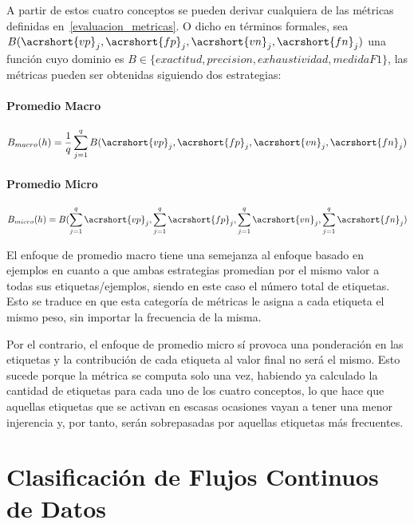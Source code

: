 A partir de estos cuatro conceptos se pueden derivar cualquiera de las métricas
definidas en~\ref{evaluacion_metricas}. O dicho en términos formales, sea
$B(\acrshort{vp}_{j}, \acrshort{fp}_{j}, \acrshort{vn}_{j}, \acrshort{fn}_{j})$
una función cuyo dominio es $B \in \{ exactitud, precision, exhaustividad,
	medidaF1 \}$, las métricas pueden ser obtenidas siguiendo dos estrategias:

\paragraph{Promedio Macro}

\begin{equation}
	B_{macro}(h) = \frac{1}{q} \sum_{j=1}^{q}
	B(\acrshort{vp}_{j}, \acrshort{fp}_{j}, \acrshort{vn}_{j}, \acrshort{fn}_{j})
\end{equation}

\paragraph{Promedio Micro}

\begin{equation}
	B_{micro}(h) = B( \sum_{j=1}^{q} \acrshort{vp}_{j}, \sum_{j=1}^{q}
	\acrshort{fp}_{j},\sum_{j=1}^{q}  \acrshort{vn}_{j},\sum_{j=1}^{q}
	\acrshort{fn}_{j})
\end{equation}

El enfoque de promedio macro tiene una semejanza al enfoque basado en ejemplos
en cuanto a que ambas estrategias promedian por el mismo valor a todas sus
etiquetas/ejemplos, siendo en este caso el número total de etiquetas. Esto se
traduce en que esta categoría de métricas le asigna a cada etiqueta el mismo
peso, sin importar la frecuencia de la misma.

Por el contrario, el enfoque de promedio micro sí provoca una ponderación en las
etiquetas y la contribución de cada etiqueta al valor final no será el mismo.
Esto sucede porque la métrica se computa solo una vez, habiendo ya calculado la
cantidad de etiquetas para cada uno de los cuatro conceptos, lo que hace que
aquellas etiquetas que se activan en escasas ocasiones vayan a tener una menor
injerencia y, por tanto, serán sobrepasadas por aquellas etiquetas más frecuentes.

\section{Clasificación de Flujos Continuos de Datos}

